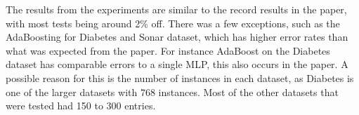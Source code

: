 The results from the experiments are similar to the record results in the paper, with most tests being around 2\% off.
There was a few exceptions, such as the AdaBoosting for Diabetes and Sonar dataset, which has higher error rates than what was expected from the paper.
For instance AdaBoost on the Diabetes dataset has comparable errors to a single MLP, this also occurs in the paper.
A possible reason for this is the number of instances in each dataset, as Diabetes is one of the larger datasets
with 768 instances.
Most of the other datasets that were tested had 150 to 300 entries.



